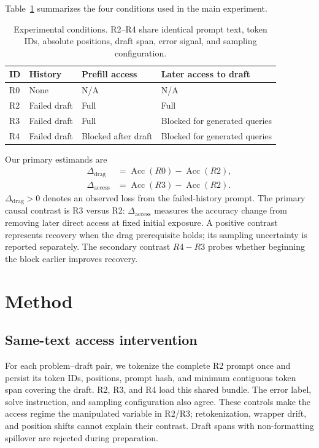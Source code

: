 \documentclass{article}
\begin{document}
Table~\ref{tab:conditions} summarizes the four conditions used in the main experiment.

\begin{table}[t]
\caption{Experimental conditions. R2--R4 share identical prompt text, token IDs, absolute positions, draft span, error signal, and sampling configuration.}
\label{tab:conditions}
\centering
\small
\begin{tabular}{llll}
\toprule
ID & History & Prefill access & Later access to draft \\
\midrule
R0 & None & N/A & N/A \\
R2 & Failed draft & Full & Full \\
R3 & Failed draft & Full & Blocked for generated queries \\
R4 & Failed draft & Blocked after draft & Blocked for generated queries \\
\bottomrule
\end{tabular}
\end{table}

Our primary estimands are
\begin{align}
    \Delta_{\mathrm{drag}} &= \operatorname{Acc}(R0)-\operatorname{Acc}(R2), \\
    \Delta_{\mathrm{access}} &= \operatorname{Acc}(R3)-\operatorname{Acc}(R2).
\end{align}
$\Delta_{\mathrm{drag}}>0$ denotes an observed loss from the failed-history prompt. The primary causal contrast is R3 versus R2: $\Delta_{\mathrm{access}}$ measures the accuracy change from removing later direct access at fixed initial exposure. A positive contrast represents recovery when the drag prerequisite holds; its sampling uncertainty is reported separately. The secondary contrast $R4-R3$ probes whether beginning the block earlier improves recovery.

\section{Method}
\label{sec:method}

\subsection{Same-text access intervention}

For each problem--draft pair, we tokenize the complete R2 prompt once and persist its token IDs, positions, prompt hash, and minimum contiguous token span covering the draft. R2, R3, and R4 load this shared bundle. The error label, solve instruction, and sampling configuration also agree. These controls make the access regime the manipulated variable in R2/R3; retokenization, wrapper drift, and position shifts cannot explain their contrast. Draft spans with non-formatting spillover are rejected during preparation.
\end{document}
